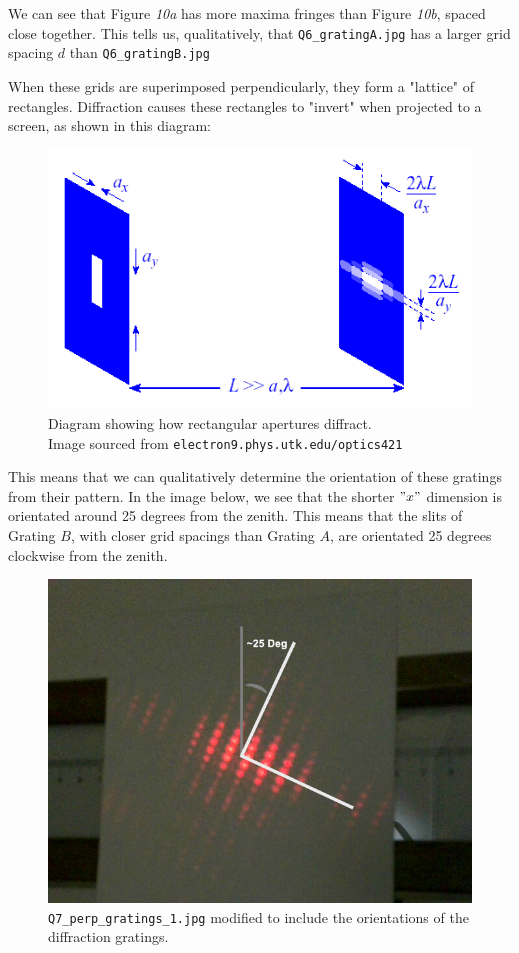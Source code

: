 \documentclass[a4paper]{article}
\begin{document}
We can see that Figure \emph{10a} has more maxima fringes than Figure \emph{10b}, spaced close together. This tells us, qualitatively, that {\lstinline$Q6_gratingA.jpg$} has a larger grid spacing $d$ than {\lstinline$Q6_gratingB.jpg$}

When these grids are superimposed perpendicularly, they form a "lattice" of rectangles. Diffraction causes these rectangles to "invert" when projected to a screen, as shown in this diagram:

\begin{figure}[h!]
\centering
\centerline{\includegraphics[scale=0.5]{rectangles.png}}
\caption{Diagram showing how rectangular apertures diffract. \\Image sourced from {\lstinline$electron9.phys.utk.edu/optics421$}} 
\label{fig:rectangles}
\end{figure}

This means that we can qualitatively determine the orientation of these gratings from their pattern. In the image below, we see that the shorter $"x"$ dimension is orientated around 25 degrees from the zenith. This means that the slits of Grating $B$, with closer grid spacings than Grating $A$, are orientated 25 degrees clockwise from the zenith. 
\newpage
\begin{figure}[h!]
\centering
\centerline{\includegraphics[scale=0.5]{perp.png}}
\caption{{\lstinline$Q7_perp_gratings_1.jpg$} modified to include the orientations of the diffraction gratings.} 
\label{fig:perp}
\end{figure}
\end{document}
